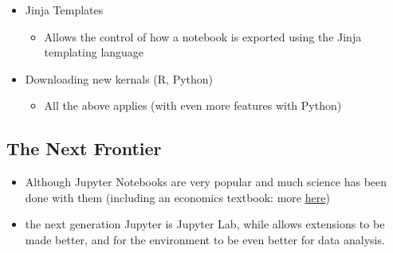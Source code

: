 \documentclass[10pt,parskip=half,
	toc=sectionentrywithdots,
	bibliography=totocnumbered,
	captions=tableheading,numbers=noendperiod]{scrartcl}
\providecommand{\tightlist}{%
  \setlength{\itemsep}{0pt}\setlength{\parskip}{0pt}}
\begin{document}
\begin{itemize}
\tightlist
\item
  Jinja Templates

  \begin{itemize}
  \tightlist
  \item
    Allows the control of how a notebook is exported using the Jinja
    templating language
  \end{itemize}
\item
  Downloading new kernals (R, Python)

  \begin{itemize}
  \tightlist
  \item
    All the above applies (with even more features with Python)
  \end{itemize}
\end{itemize}

\hypertarget{the-next-frontier}{%
\subsection{The Next Frontier}\label{the-next-frontier}}

\begin{itemize}
\tightlist
\item
  Although Jupyter Notebooks are very popular and much science has been
  done with them (including an economics textbook: more
  \href{https://quantecon.org}{here})
\item
  the next generation Jupyter is Jupyter Lab, while allows extensions to
  be made better, and for the environment to be even better for data
  analysis.
\end{itemize}

	
\end{document}
